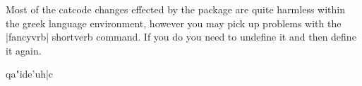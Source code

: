 \begin{multicols}{2}
%

Most of the catcode changes effected by the package are quite harmless within the greek language environment, however you may pick up problems with the |fancyvrb| shortverb command. If you do you need to undefine it and then define it again.

\begin{teXXX}
\UndefineShortVerb{\|}
  \textgreek{qa"ide'uh|c}
\DefineShortVerb{\|}
\end{teXXX}




\end{multicols}
